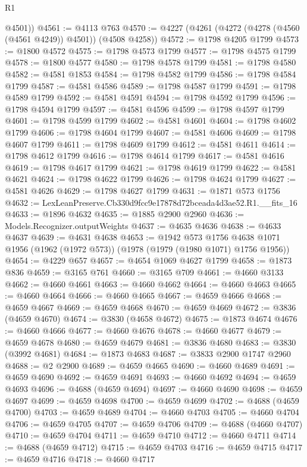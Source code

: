 \begin{lexlean}{R1}
\begin{coremodule}
        @4501))
@4561 := @4113 @763
@4570 := @4227 (@4261 (@4272 (@4278 (@4560 (@4561 @4249)) @4501)) (@4508 @4258))
@4572 := @1798 @4205 @1799
@4573 := @1800 @4572
@4575 := @1798 @4573 @1799
@4577 := @1798 @4575 @1799
@4578 := @1800 @4577
@4580 := @1798 @4578 @1799
@4581 := @1798 @4580
@4582 := @4581 @1853
@4584 := @1798 @4582 @1799
@4586 := @1798 @4584 @1799
@4587 := @4581 @4586
@4589 := @1798 @4587 @1799
@4591 := @1798 @4589 @1799
@4592 := @4581 @4591
@4594 := @1798 @4592 @1799
@4596 := @1798 @4594 @1799
@4597 := @4581 @4596
@4599 := @1798 @4597 @1799
@4601 := @1798 @4599 @1799
@4602 := @4581 @4601
@4604 := @1798 @4602 @1799
@4606 := @1798 @4604 @1799
@4607 := @4581 @4606
@4609 := @1798 @4607 @1799
@4611 := @1798 @4609 @1799
@4612 := @4581 @4611
@4614 := @1798 @4612 @1799
@4616 := @1798 @4614 @1799
@4617 := @4581 @4616
@4619 := @1798 @4617 @1799
@4621 := @1798 @4619 @1799
@4622 := @4581 @4621
@4624 := @1798 @4622 @1799
@4626 := @1798 @4624 @1799
@4627 := @4581 @4626
@4629 := @1798 @4627 @1799
@4631 := @1871 @573 @1756
@4632 := LexLeanPreserve.Cb330d9fcc9e17878d72bceada4d3ae52.R1.__fits_16
@4633 := @1896 @4632
@4635 := @1885 @2900 @2960
@4636 := Models.Recognizer.outputWeights
@4637 := @4635 @4636
@4638 := @4633 @4637
@4639 := @4631 @4638
@4653 := @1942
    @573
    @1756
    @4638
    @1071
    @1956
    (@1962 (@1972 @573))
    (@1978 (@1979 (@1980 @1071) @1756 @1956))
@4654 := @4229 @657
@4657 := @4654 @1069 @4627 @1799
@4658 := @1873 @836
@4659 := @3165 @761
@4660 := @3165 @709
@4661 := @4660 @3133
@4662 := @4660 @4661
@4663 := @4660 @4662
@4664 := @4660 @4663
@4665 := @4660 @4664
@4666 := @4660 @4665
@4667 := @4659 @4666
@4668 := @4659 @4667
@4669 := @4659 @4668
@4670 := @4659 @4669
@4672 := @3836 (@4659 @4670)
@4674 := @3830 (@4658 @4672)
@4675 := @1873 @4674
@4676 := @4660 @4666
@4677 := @4660 @4676
@4678 := @4660 @4677
@4679 := @4659 @4678
@4680 := @4659 @4679
@4681 := @3836 @4680
@4683 := @3830 (@3992 @4681)
@4684 := @1873 @4683
@4687 := @3833 @2900 @1747 @2960
@4688 := @2 @2900
@4689 := @4659 @4665
@4690 := @4660 @4689
@4691 := @4659 @4690
@4692 := @4659 @4691
@4693 := @4660 @4692
@4694 := @4659 @4693
@4696 := @4688 (@4659 @4694)
@4697 := @4660 @4690
@4698 := @4659 @4697
@4699 := @4659 @4698
@4700 := @4659 @4699
@4702 := @4688 (@4659 @4700)
@4703 := @4659 @4689
@4704 := @4660 @4703
@4705 := @4660 @4704
@4706 := @4659 @4705
@4707 := @4659 @4706
@4709 := @4688 (@4660 @4707)
@4710 := @4659 @4704
@4711 := @4659 @4710
@4712 := @4660 @4711
@4714 := @4688 (@4659 @4712)
@4715 := @4659 @4703
@4716 := @4659 @4715
@4717 := @4659 @4716
@4718 := @4660 @4717

\end{coremodule}
\end{lexlean}
